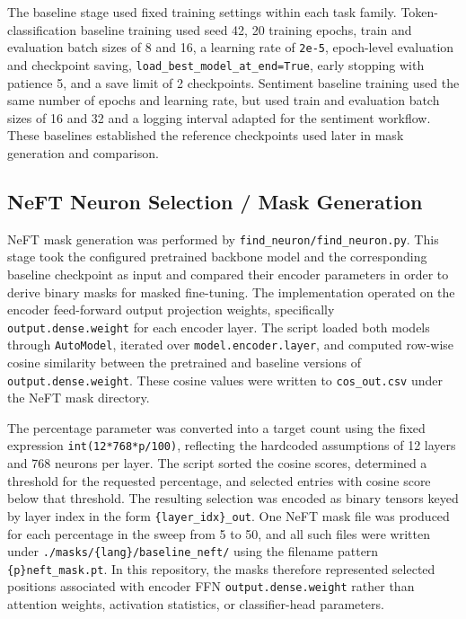 \documentclass[12pt]{article}
\begin{document}
The baseline stage used fixed training settings within each task family. Token-classification baseline training used seed 42, 20 training epochs, train and evaluation batch sizes of 8 and 16, a learning rate of \texttt{2e-5}, epoch-level evaluation and checkpoint saving, \texttt{load\_best\_model\_at\_end=True}, early stopping with patience 5, and a save limit of 2 checkpoints. Sentiment baseline training used the same number of epochs and learning rate, but used train and evaluation batch sizes of 16 and 32 and a logging interval adapted for the sentiment workflow. These baselines established the reference checkpoints used later in mask generation and comparison.

\subsection{NeFT Neuron Selection / Mask Generation}

NeFT mask generation was performed by \texttt{find\_neuron/find\_neuron.py}. This stage took the configured pretrained backbone model and the corresponding baseline checkpoint as input and compared their encoder parameters in order to derive binary masks for masked fine-tuning. The implementation operated on the encoder feed-forward output projection weights, specifically \texttt{output.dense.weight} for each encoder layer. The script loaded both models through \texttt{AutoModel}, iterated over \texttt{model.encoder.layer}, and computed row-wise cosine similarity between the pretrained and baseline versions of \texttt{output.dense.weight}. These cosine values were written to \texttt{cos\_out.csv} under the NeFT mask directory.

The percentage parameter was converted into a target count using the fixed expression \texttt{int(12*768*p/100)}, reflecting the hardcoded assumptions of 12 layers and 768 neurons per layer. The script sorted the cosine scores, determined a threshold for the requested percentage, and selected entries with cosine score below that threshold. The resulting selection was encoded as binary tensors keyed by layer index in the form \texttt{\{layer\_idx\}\_out}. One NeFT mask file was produced for each percentage in the sweep from 5 to 50, and all such files were written under \texttt{./masks/\{lang\}/baseline\_neft/} using the filename pattern \texttt{\{p\}neft\_mask.pt}. In this repository, the masks therefore represented selected positions associated with encoder FFN \texttt{output.dense.weight} rather than attention weights, activation statistics, or classifier-head parameters.
\end{document}

